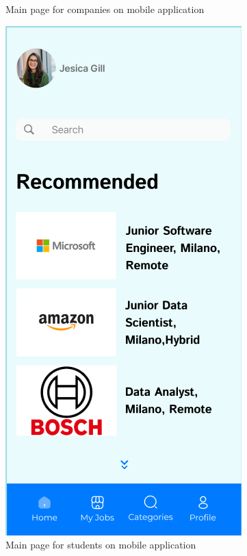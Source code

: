 \begin{figure}[ht]
\begin{minipage}{0.45\textwidth}
        \caption{Main page for companies on mobile application}
        \label{fig:image1}
    \end{minipage}
    \hspace{0.05\textwidth}  %
    \begin{minipage}{0.45\textwidth}
        \centering
        \includegraphics[width=\textwidth]{RASD-Latex/assets/UI images/mainpage_student_phone.png}
        \caption{Main page for students on mobile application}
        \label{fig:image2}
    \end{minipage}
\end{figure}

